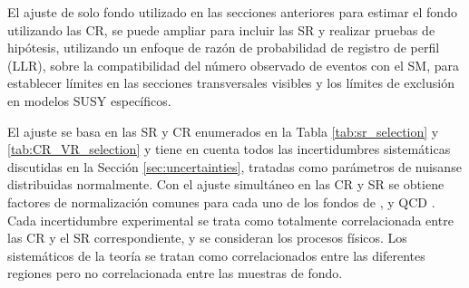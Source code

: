 El ajuste de solo fondo utilizado en las secciones anteriores para estimar el fondo utilizando las CR, se puede ampliar para incluir las SR y realizar pruebas de hipótesis, utilizando un enfoque de razón de probabilidad de registro de perfil (LLR), sobre la compatibilidad del número observado de eventos con el SM, para establecer límites en las secciones transversales visibles y los límites de exclusión en modelos SUSY específicos.

%   



El ajuste se basa en las SR y CR enumerados en la Tabla
\ref{tab:sr_selection} y \ref{tab:CR_VR_selection} y tiene en cuenta todos las
incertidumbres sistemáticas discutidas en la Sección \ref{sec:uncertainties}, tratadas como parámetros de nuisanse distribuidas normalmente. Con el ajuste simultáneo en
las CR y SR se obtiene factores de normalización comunes para cada uno de los fondos de {\wph},
{\ttbarph} y QCD {\phj}. Cada incertidumbre experimental se trata como totalmente correlacionada entre las CR y el SR correspondiente, y se consideran los procesos físicos. Los sistemáticos de la teoría se tratan como correlacionados entre las diferentes regiones pero no correlacionada entre las muestras de fondo.

